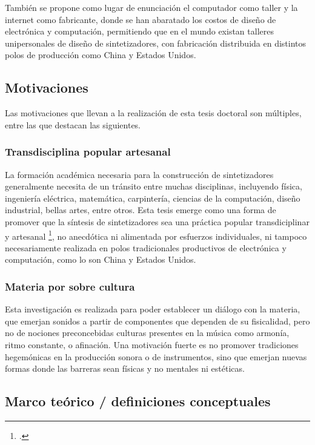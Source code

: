 \documentclass[../proyecto.tex]{subfiles}
\begin{document}
También se propone como lugar de enunciación el computador como taller y la internet como fabricante, donde se han abaratado los costos de diseño de electrónica y computación, permitiendo que en el mundo existan talleres unipersonales de diseño de sintetizadores, con fabricación distribuida en distintos polos de producción como China y Estados Unidos.

\subsection{Motivaciones}

Las motivaciones que llevan a la realización de esta tesis doctoral son múltiples, entre las que destacan las siguientes.

\subsubsection{Transdisciplina popular artesanal}

La formación académica necesaria para la construcción de sintetizadores generalmente necesita de un tránsito entre muchas disciplinas, incluyendo física, ingeniería eléctrica, matemática, carpintería, ciencias de la computación, diseño industrial, bellas artes, entre otros. Esta tesis emerge como una forma de promover que la síntesis de sintetizadores sea una práctica popular transdiciplinar y artesanal \footcite{collins_handmade_2020}, no anecdótica ni alimentada por esfuerzos individuales, ni tampoco necesariamente realizada en polos tradicionales productivos de electrónica y computación, como lo son China y Estados Unidos.

\subsubsection{Materia por sobre cultura}

Esta investigación es realizada para poder establecer un diálogo con la materia, que emerjan sonidos a partir de componentes que dependen de su fisicalidad, pero no de nociones preconcebidas culturas presentes en la música como armonía, ritmo constante, o afinación. Una motivación fuerte es no promover tradiciones hegemónicas en la producción sonora o de instrumentos, sino que emerjan nuevas formas donde las barreras sean físicas y no mentales ni estéticas.

\subsection{Marco teórico / definiciones conceptuales}
\end{document}
